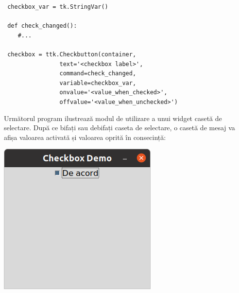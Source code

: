 \documentclass[12pt,a4paper]{book}
\begin{document}
\begin{verbatim}
 checkbox_var = tk.StringVar()

 def check_changed():
    #...

 checkbox = ttk.Checkbutton(container,
                text='<checkbox label>',
                command=check_changed,
                variable=checkbox_var,
                onvalue='<value_when_checked>',
                offvalue='<value_when_unchecked>')
\end{verbatim}
Următorul program ilustrează modul de utilizare a unui widget casetă de selectare.  După ce bifați sau debifați caseta de selectare, o casetă de mesaj va afișa valoarea activată și valoarea oprită în consecință:

\includegraphics[width=\linewidth, scale=0.25]{img04.png}
\end{document}
